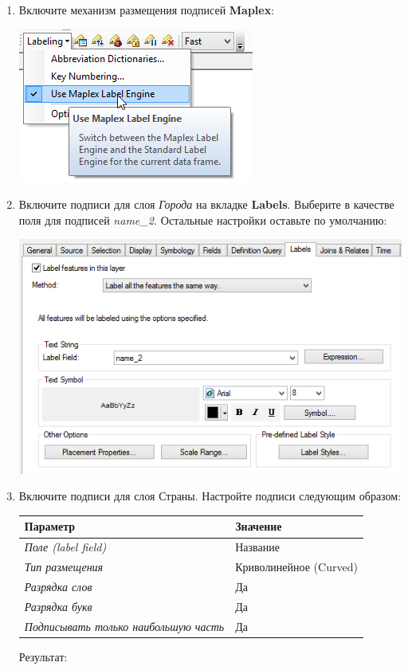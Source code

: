 \documentclass[]{book}
\theoremstyle{definition}
\theoremstyle{definition}
\theoremstyle{definition}
\theoremstyle{remark}
\begin{document}
\begin{enumerate}
\def\labelenumi{\arabic{enumi}.}
\item
  Включите механизм размещения подписей \textbf{Maplex}:

  \includegraphics{images/Ex04/image26.png}
\item
  Включите подписи для слоя \emph{Города} на вкладке \textbf{Labels}.
  Выберите в качестве поля для подписей \emph{name\_2.} Остальные
  настройки оставьте по умолчанию:

  \includegraphics{images/Ex04/image27.png}
\item
  Включите подписи для слоя Страны. Настройте подписи следующим образом:

  \begin{longtable}[]{@{}ll@{}}
  \toprule
  \textbf{Параметр} & \textbf{Значение}\tabularnewline
  \midrule
  \endhead
  \emph{Поле (label field)} & Название\tabularnewline
  \emph{Тип размещения} & Криволинейное (Curved)\tabularnewline
  \emph{Разрядка слов} & Да\tabularnewline
  \emph{Разрядка букв} & Да\tabularnewline
  \emph{Подписывать только наибольшую часть} & Да\tabularnewline
  \bottomrule
  \end{longtable}

  Результат:


\end{enumerate}
\end{document}
